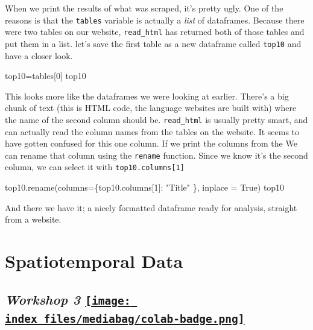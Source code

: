 \documentclass[
  letterpaper,
  DIV=11,
  numbers=noendperiod]{scrreprt}
\newenvironment{Shaded}{\begin{snugshade}}{\end{snugshade}}
\newcommand{\DecValTok}[1]{\textcolor[rgb]{0.68,0.00,0.00}{#1}}
\newcommand{\NormalTok}[1]{\textcolor[rgb]{0.00,0.23,0.31}{#1}}
\newcommand{\OperatorTok}[1]{\textcolor[rgb]{0.37,0.37,0.37}{#1}}
\newcommand{\StringTok}[1]{\textcolor[rgb]{0.13,0.47,0.30}{#1}}
\newcommand{\VariableTok}[1]{\textcolor[rgb]{0.07,0.07,0.07}{#1}}
\begin{document}
When we print the results of what was scraped, it's pretty ugly. One of
the reasons is that the \texttt{tables} variable is actually a
\emph{list} of dataframes. Because there were two tables on our website,
\texttt{read\_html} has returned both of those tables and put them in a
list. let's save the first table as a new dataframe called
\texttt{top10} and have a closer look.

\begin{Shaded}
\begin{Highlighting}[]
\NormalTok{top10}\OperatorTok{=}\NormalTok{tables[}\DecValTok{0}\NormalTok{]}
\NormalTok{top10}
\end{Highlighting}
\end{Shaded}

This looks more like the dataframes we were looking at earlier. There's
a big chunk of text (this is HTML code, the language websites are built
with) where the name of the second column should be. \texttt{read\_html}
is usually pretty smart, and can actually read the column names from the
tables on the website. It seems to have gotten confused for this one
column. If we print the columns from the We can rename that column using
the \texttt{rename} function. Since we know it's the second column, we
can select it with \texttt{top10.columns{[}1{]}}

\begin{Shaded}
\begin{Highlighting}[]
\NormalTok{top10.rename(columns}\OperatorTok{=}\NormalTok{\{top10.columns[}\DecValTok{1}\NormalTok{]: }\StringTok{"Title"}\NormalTok{ \}, inplace }\OperatorTok{=} \VariableTok{True}\NormalTok{)}
\NormalTok{top10}
\end{Highlighting}
\end{Shaded}

And there we have it; a nicely formatted dataframe ready for analysis,
straight from a website.


\hypertarget{spatiotemporal-data}{%
\chapter{Spatiotemporal Data}\label{spatiotemporal-data}}

\hypertarget{workshop-3-open-in-colab}{%
\section[\emph{Workshop 3} ]{\texorpdfstring{\emph{Workshop 3}
\href{https://colab.research.google.com/github/oballinger/QM2/blob/main/notebooks/W03.\%20Spatial\%20Data.ipynb}{\protect\texttt{[image: index\_files/mediabag/colab-badge.png]}}}{Workshop 3 Open In Colab}}\label{workshop-3-open-in-colab}}
\end{document}

